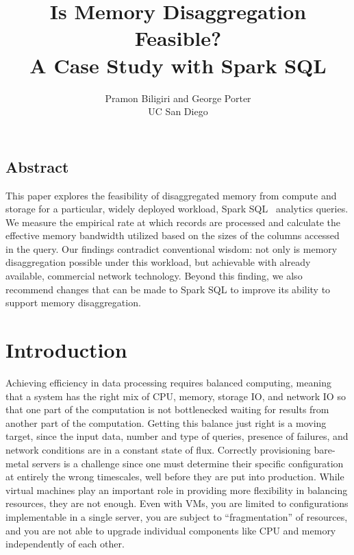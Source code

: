 \documentclass[9pt]{sig-alternate-05-2015}
\begin{document}
 {}
\date{}



\title{Is Memory Disaggregation Feasible?\\A Case Study with Spark SQL}

\author{Pramon Biligiri and George Porter\\UC San Diego}

\maketitle


\subsection*{Abstract}

This paper explores the feasibility of disaggregated memory from compute and
storage for a particular, widely deployed workload, Spark
SQL~\cite{Armbrust:2015:SSR:2723372.2742797} analytics queries.  We measure the
empirical rate at which records are processed and calculate the effective
memory bandwidth utilized based on the sizes of the columns accessed in the
query.  Our findings contradict conventional wisdom: not only is memory
disaggregation possible under this workload, but achievable with already
available, commercial network technology.  Beyond this finding, we also
recommend changes that can be made to Spark SQL to improve its ability to
support memory disaggregation.

\section{Introduction}

Achieving efficiency in data processing requires balanced computing, meaning
that a system has the right mix of CPU, memory, storage IO, and network IO so
that one part of the computation is not bottlenecked waiting for results from
another part of the computation.  Getting this balance just right is a moving
target, since the input data, number and type of queries, presence of failures,
and network conditions are in a constant state of flux.  Correctly provisioning
bare-metal servers is a challenge since one must determine their specific
configuration at entirely the wrong timescales, well before they are put into
production.  While virtual machines play an important role in providing more
flexibility in balancing resources, they are not enough.  Even with VMs, you are
limited to configurations implementable in a single server, you are subject to
``fragmentation'' of resources, and you are not able to
upgrade individual components like CPU and memory independently of each other.
\end{document}
